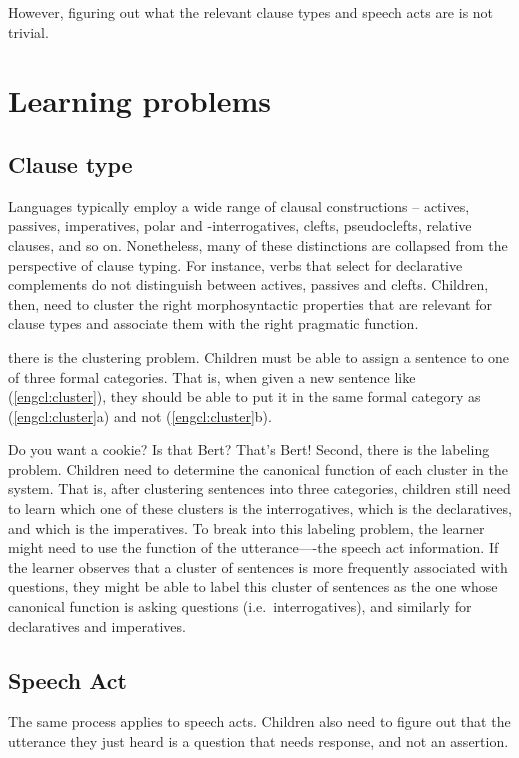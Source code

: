 However, figuring out what the relevant clause types and speech acts are is not trivial. 




\section{Learning problems}
\label{sec:intro:challenges}
\subsection{Clause type}
Languages typically employ a wide range of clausal constructions -- actives, passives, imperatives, polar and \twh-interrogatives, clefts, pseudoclefts, relative clauses, and so on. Nonetheless, many of these distinctions are collapsed from the perspective of clause typing. For instance, verbs that select for declarative complements do not distinguish between actives, passives and clefts. Children, then, need to cluster the right morphosyntactic properties that are relevant for clause types and associate them with the right pragmatic function.


there is the clustering problem. Children must be able to assign a sentence to one of three formal categories. That is, when given a new sentence like (\ref{engcl:cluster}), they should be able to put it in the same formal category as (\ref{engcl:cluster}a) and not (\ref{engcl:cluster}b). 

Do you want a cookie?
\bxl{}
Is that Bert?
\ex
That’s Bert!
\exl
\eex
Second, there is the labeling problem. Children need to determine the canonical function of each cluster in the system. That is, after clustering sentences into three categories, children still need to learn which one of these clusters is the interrogatives, which is the declaratives, and which is the imperatives. To break into this labeling problem, the learner might need to use the function of the utterance—-the speech act information. If the learner observes that a cluster of sentences is more frequently associated with questions, they might be able to label this cluster of sentences as the one whose canonical function is asking questions (i.e.\ interrogatives), and similarly for declaratives and imperatives. 

\subsection{Speech Act}
The same process applies to speech acts. Children also need to figure out that the utterance they just heard is a question that needs response, and not an assertion. 


